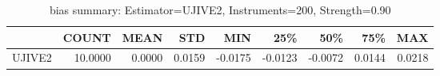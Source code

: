\begin{table}[ht]
\centering
\caption{bias summary: Estimator=UJIVE2, Instruments=200, Strength=0.90}
\begin{tabular}{lrrrrrrrr}
\toprule
 & COUNT & MEAN & STD & MIN & 25\% & 50\% & 75\% & MAX \\
\midrule
UJIVE2 & 10.0000 & 0.0000 & 0.0159 & -0.0175 & -0.0123 & -0.0072 & 0.0144 & 0.0218 \\
\bottomrule
\end{tabular}
\end{table}
